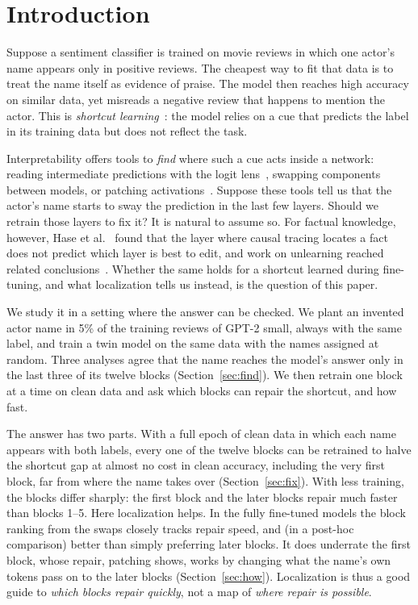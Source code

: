\section{Introduction}
\label{sec:intro}

Suppose a sentiment classifier is trained on movie reviews in which one actor's name appears only in positive reviews.
The cheapest way to fit that data is to treat the name itself as evidence of praise. The model then reaches high
accuracy on similar data, yet misreads a negative review that happens to mention the actor. This is \emph{shortcut
learning}~\cite{geirhos2020shortcut}: the model relies on a cue that predicts the label in its training data but does
not reflect the task.

Interpretability offers tools to \emph{find} where such a cue acts inside a network: reading intermediate predictions
with the logit lens~\cite{nostalgebraist2020logitlens,belrose2023tunedlens}, swapping components between models, or
patching activations~\cite{vig2020causal,meng2022locating,heimersheim2024patching}. Suppose these tools tell us that the
actor's name starts to sway the prediction in the last few layers. Should we retrain those layers to fix it? It is
natural to assume so. For factual knowledge, however, Hase et al.~\cite{hase2023localization} found that the layer
where causal tracing locates a fact does not predict which layer is best to edit, and work on unlearning reached
related conclusions~\cite{lee2025unlearning,guo2025mechanistic}. Whether the same holds for a shortcut learned during
fine-tuning, and what localization tells us instead, is the question of this paper.

We study it in a setting where the answer can be checked. We plant an invented actor name in 5\% of the training
reviews of GPT-2 small, always with the same label, and train a twin model on the same data with the names assigned
at random. Three analyses agree that the name reaches the model's answer only in the last three of its twelve blocks
(Section~\ref{sec:find}). We then retrain one block at a time on clean data and ask which blocks can repair the
shortcut, and how fast.

The answer has two parts. With a full epoch of clean data in which each name appears with both labels, every one of
the twelve blocks can be retrained to halve the shortcut gap at almost no cost in clean accuracy, including the very
first block, far from where the name takes over (Section~\ref{sec:fix}). With less training, the blocks differ
sharply: the first block and the later blocks repair much faster than blocks 1--5. Here localization helps. In the fully fine-tuned
models the block ranking from the swaps closely tracks repair speed, and (in a post-hoc comparison) better than simply
preferring later blocks. It
does underrate the first block, whose repair, patching shows, works by changing what the name's own tokens pass on to
the later blocks (Section~\ref{sec:how}). Localization is thus a good guide to \emph{which blocks repair quickly},
not a map of \emph{where repair is possible}.

